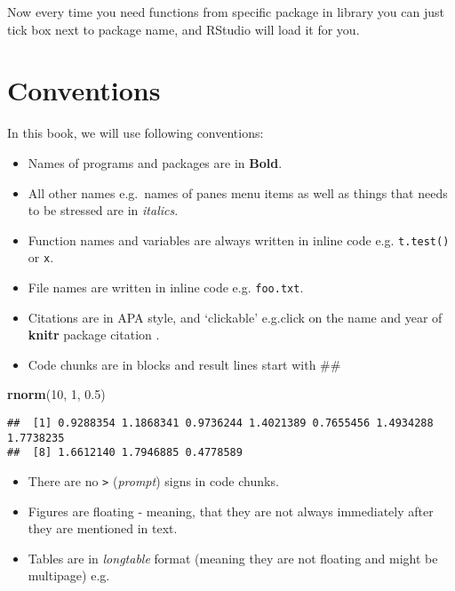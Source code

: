 \documentclass[]{book}
\newenvironment{Shaded}{\begin{snugshade}}{\end{snugshade}}
\newcommand{\KeywordTok}[1]{\textcolor[rgb]{0.13,0.29,0.53}{\textbf{#1}}}
\newcommand{\DecValTok}[1]{\textcolor[rgb]{0.00,0.00,0.81}{#1}}
\newcommand{\FloatTok}[1]{\textcolor[rgb]{0.00,0.00,0.81}{#1}}
\newcommand{\NormalTok}[1]{#1}
\providecommand{\tightlist}{%
  \setlength{\itemsep}{0pt}\setlength{\parskip}{0pt}}
\theoremstyle{definition}
\theoremstyle{definition}
\theoremstyle{definition}
\theoremstyle{remark}
\begin{document}
Now every time you need functions from specific package in library you
can just tick box next to package name, and RStudio will load it for
you.

\section{Conventions}\label{conventions}

In this book, we will use following conventions:

\begin{itemize}
\tightlist
\item
  Names of programs and packages are in \textbf{Bold}.
\item
  All other names e.g.~names of panes menu items as well as things that
  needs to be stressed are in \emph{italics}.
\item
  Function names and variables are always written in inline code e.g.
  \texttt{t.test()} or \texttt{x}.
\item
  File names are written in inline code e.g. \texttt{foo.txt}.
\item
  Citations are in APA style, and `clickable' e.g.click on the name and
  year of \textbf{knitr} package citation \citep{xie2015}.
\item
  Code chunks are in blocks and result lines start with \#\#
\end{itemize}

\begin{Shaded}
\begin{Highlighting}[]
\KeywordTok{rnorm}\NormalTok{(}\DecValTok{10}\NormalTok{, }\DecValTok{1}\NormalTok{, }\FloatTok{0.5}\NormalTok{)}
\end{Highlighting}
\end{Shaded}

\begin{verbatim}
##  [1] 0.9288354 1.1868341 0.9736244 1.4021389 0.7655456 1.4934288 1.7738235
##  [8] 1.6612140 1.7946885 0.4778589
\end{verbatim}

\begin{itemize}
\tightlist
\item
  There are no \texttt{\textgreater{}} (\emph{prompt}) signs in code
  chunks.
\item
  Figures are floating - meaning, that they are not always immediately
  after they are mentioned in text.
\item
  Tables are in \emph{longtable} format (meaning they are not floating
  and might be multipage) e.g.
\end{itemize}
\end{document}
